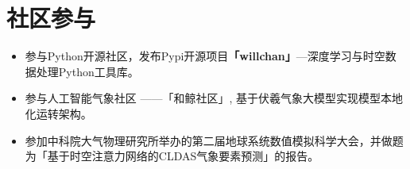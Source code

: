\documentclass{resume}
\begin{document}

\vspace{0.2cm}
\section{社区参与}
\begin{itemize}[parsep=0.2ex]
  \item 参与Python开源社区，发布Pypi开源项目\textbf{「willchan」}—深度学习与时空数据处理Python工具库。
  \item 参与人工智能气象社区 ——「和鲸社区」, 基于伏羲气象大模型实现模型本地化运转架构。
  \item 参加中科院大气物理研究所举办的第二届地球系统数值模拟科学大会，并做题为「基于时空注意力网络的CLDAS气象要素预测」的报告。
\end{itemize}

%
%
\end{document}
